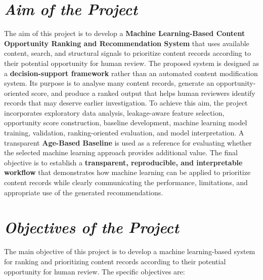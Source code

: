 \documentclass[12pt,a4paper]{report}
\begin{document}
\section{\textit{Aim of the Project}}

The aim of this project is to develop a \textbf{Machine Learning-Based Content Opportunity Ranking and Recommendation System} that uses available content, search, and structural signals to prioritize content records according to their potential opportunity for human review. The proposed system is designed as a \textbf{decision-support framework} rather than an automated content modification system. Its purpose is to analyse many content records, generate an opportunity-oriented score, and produce a ranked output that helps human reviewers identify records that may deserve earlier investigation. To achieve this aim, the project incorporates exploratory data analysis, leakage-aware feature selection, opportunity score construction, baseline development, machine learning model training, validation, ranking-oriented evaluation, and model interpretation. A transparent \textbf{Age-Based Baseline} is used as a reference for evaluating whether the selected machine learning approach provides additional value. The final objective is to establish a \textbf{transparent, reproducible, and interpretable workflow} that demonstrates how machine learning can be applied to prioritize content records while clearly communicating the performance, limitations, and appropriate use of the generated recommendations.

\section{\textit{Objectives of the Project}}
The main objective of this project is to develop a machine learning-based system for ranking and prioritizing content records according to their potential opportunity for human review. The specific objectives are:
\end{document}
